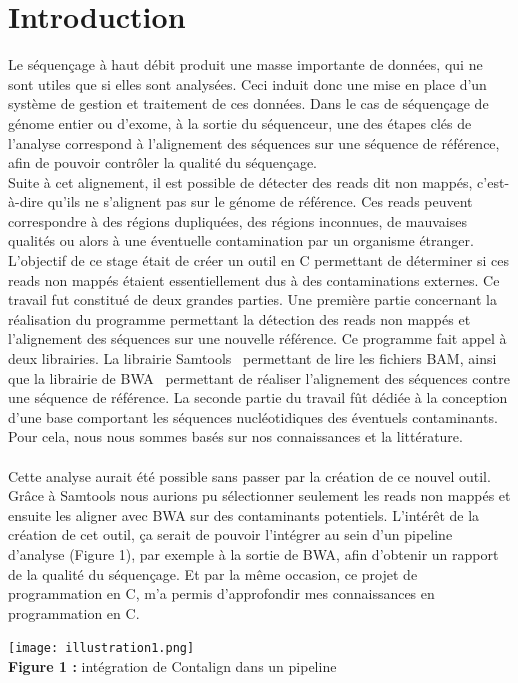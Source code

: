 \documentclass[a4paper,12pt]{article}
\begin{document}
\section{Introduction}

Le séquençage à haut débit produit une masse importante de données, qui ne sont utiles que si elles sont analysées. Ceci induit donc une mise en place d'un système de gestion et traitement de ces données. Dans le cas de séquençage de génome entier ou d'exome, à la sortie du séquenceur, une des étapes clés de l'analyse correspond à l'alignement des séquences sur une séquence de référence, afin de pouvoir contrôler la qualité du séquençage. \\
Suite à cet alignement, il est possible de détecter des reads dit non mappés, c'est-à-dire qu'ils ne s'alignent pas sur le génome de référence. Ces reads peuvent correspondre à des régions dupliquées, des régions inconnues, de mauvaises qualités ou alors à une éventuelle contamination par un organisme étranger. \\

L'objectif de ce stage était de créer un outil en C permettant de déterminer si ces reads non mappés étaient essentiellement dus à des contaminations externes. Ce travail fut constitué de deux grandes parties. Une première partie concernant la réalisation du programme permettant la détection des reads non mappés et l'alignement des séquences sur une nouvelle référence. Ce programme fait appel à deux librairies. La librairie Samtools~\cite{SAM} permettant de lire les fichiers BAM, ainsi que la librairie de BWA~\cite{BWA} permettant de réaliser l'alignement des séquences contre une séquence de référence. La seconde partie du travail fût dédiée à la conception d'une base comportant les séquences nucléotidiques des éventuels contaminants. Pour cela, nous nous sommes basés sur nos connaissances et la littérature. \\\\
Cette analyse aurait été possible sans passer par la création de ce nouvel outil. Grâce à Samtools nous aurions pu sélectionner seulement les reads non mappés et ensuite les aligner avec BWA sur des contaminants potentiels. L'intérêt de la création de cet outil, ça serait de pouvoir l'intégrer au sein d'un pipeline d'analyse (Figure 1), par exemple à la sortie de BWA, afin d'obtenir un rapport de la qualité du séquençage. Et par la même occasion, ce projet de programmation en C, m'a permis d'approfondir mes connaissances en programmation en C. 
\begin{center}
\texttt{[image: illustration1.png]}~\\
\textbf{Figure 1 :} intégration de Contalign dans un pipeline
\end{center}
\end{document}
